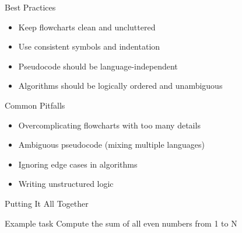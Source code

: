 \documentclass[12pt, aspectratio=169]{beamer}
\begin{document}
    

    \begin{frame}{Best Practices}
    \begin{itemize}
        \item Keep flowcharts clean and uncluttered
        \item Use consistent symbols and indentation
        \item Pseudocode should be language-independent
        \item Algorithms should be logically ordered and unambiguous
    \end{itemize}
    \end{frame}
    

    \begin{frame}{Common Pitfalls}
    \begin{itemize}
        \item Overcomplicating flowcharts with too many details
        \item Ambiguous pseudocode (mixing multiple languages)
        \item Ignoring edge cases in algorithms
        \item Writing unstructured logic
    \end{itemize}
    \end{frame}
    

    \begin{frame}{Putting It All Together}
    \begin{block}{Example task}
    Compute the sum of all even numbers from 1 to N
    \end{block}
    \end{frame}
\end{document}
